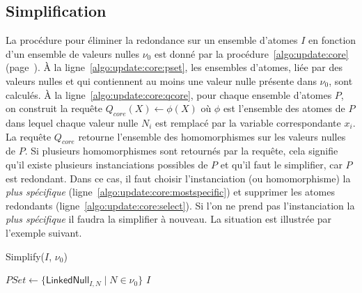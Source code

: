 \subsection{Simplification}
La procédure pour éliminer la redondance sur un ensemble d'atomes $I$ en fonction d'un ensemble de valeurs nulles $\nu_0$ est donné par la procédure~\ref{algo:update:core} (page~\pageref{algo:update:core}).
À la ligne~\ref{algo:update:core:pset}, les ensembles d'atomes, liée par des valeurs nulles et qui contiennent au moins une valeur nulle présente dans $\nu_0$, sont calculés.
À la ligne~\ref{algo:update:core:qcore}, pour chaque ensemble d'atomes $P$, on construit la requête $Q_{core}(X) \gets \phi(X)$ où $\phi$ est l'ensemble des atomes de $P$ dans lequel chaque valeur nulle $N_i$ est remplacé par la variable correspondante $x_i$.
La requête $Q_{core}$ retourne l'ensemble des homomorphismes sur les valeurs nulles de $P$.
Si plusieurs homomorphismes sont retournés par la requête, cela signifie qu'il existe plusieurs instanciations possibles de $P$ et qu'il faut le simplifier, car $P$ est redondant.
Dans ce cas, il faut choisir l'instanciation (ou homomorphisme) la \textit{plus spécifique} (ligne~\ref{algo:update:core:mostspecific}) et supprimer les atomes redondants (ligne~\ref{algo:update:core:select}).
Si l'on ne prend pas l'instanciation la \textit{plus spécifique} il faudra la simplifier à nouveau.
La situation est illustrée par l'exemple suivant.

\begin{procedure}[htb]
	\caption{Simplify($I$, $\nu_0$)}
	\label{algo:update:core}

	$PSet \gets \{\textsf{LinkedNull}_{I,N} \mid N \in \nu_0\}$\; \label{algo:update:core:pset}
	\Return $I$\;
\end{procedure}

